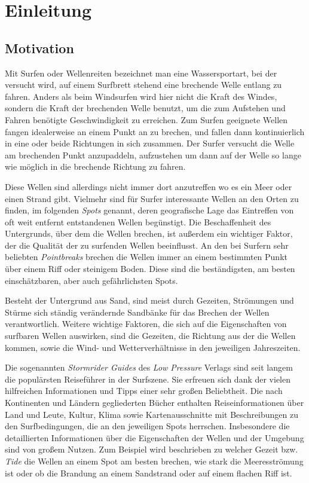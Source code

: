 
\chapter{Einleitung}

\section{Motivation}

Mit Surfen oder Wellenreiten bezeichnet man eine Wassersportart, bei
der versucht wird, auf einem Surfbrett stehend eine brechende Welle
entlang zu fahren. Anders als beim Windsurfen wird hier nicht die
Kraft des Windes, sondern die Kraft der brechenden Welle benutzt, um
die zum Aufstehen und Fahren benötigte Geschwindigkeit zu
erreichen. Zum Surfen geeignete Wellen fangen idealerweise an einem
Punkt an zu brechen, und fallen dann kontinuierlich in eine oder beide
Richtungen in sich zusammen. Der Surfer versucht die Welle am
brechenden Punkt anzupaddeln, aufzustehen um dann auf der Welle so
lange wie möglich in die brechende Richtung zu fahren.

Diese Wellen sind allerdings nicht immer dort anzutreffen wo es ein
Meer oder einen Strand gibt. Vielmehr sind für Surfer interessante
Wellen an den Orten zu finden, im folgenden \textit{Spots} genannt,
deren geografische Lage das Eintreffen von oft weit entfernt
entstandenen Wellen begünstigt. Die Beschaffenheit des Untergrunds,
über dem die Wellen brechen, ist außerdem ein wichtiger Faktor, der
die Qualität der zu surfenden Wellen beeinflusst. An den bei Surfern
sehr beliebten \textit{Pointbreaks} brechen die Wellen immer an einem
bestimmten Punkt über einem Riff oder steinigem Boden. Diese sind die
beständigsten, am besten einschätzbaren, aber auch gefährlichsten
Spots.

Besteht der Untergrund aus Sand, sind meist durch Gezeiten, Strömungen
und Stürme sich ständig verändernde Sandbänke für das Brechen der
Wellen verantwortlich. Weitere wichtige Faktoren, die sich auf die
Eigenschaften von surfbaren Wellen auswirken, sind die Gezeiten, die
Richtung aus der die Wellen kommen, sowie die Wind- und
Wetterverhältnisse in den jeweiligen Jahreszeiten.

Die sogenannten \textit{Stormrider Guides} des \textit{Low Pressure}
Verlags sind seit langem die populärsten Reiseführer in der
Surfszene. Sie erfreuen sich dank der vielen hilfreichen Informationen
und Tipps einer sehr großen Beliebtheit. Die nach Kontinenten und
Ländern gegliederten Bücher enthalten Reiseinformationen über Land und
Leute, Kultur, Klima sowie Kartenausschnitte mit Beschreibungen zu den
Surfbedingungen, die an den jeweiligen Spots herrschen. Insbesondere
die detaillierten Informationen über die Eigenschaften der Wellen und
der Umgebung sind von großem Nutzen. Zum Beispiel wird beschrieben zu
welcher Gezeit bzw. \textit{Tide} die Wellen an einem Spot am besten brechen,
wie stark die Meeresströmung ist oder ob die Brandung an einem
Sandstrand oder auf einem flachen Riff ist.

